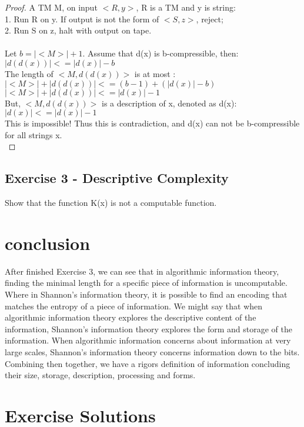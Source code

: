 \documentclass[12pt]{article}
\begin{document}
\begin{proof}
A TM M, on input $<R,y>$, R is a TM and y is string:\\
    1. Run R on y. If output is not the form of $<S,z>$, reject;\\
    2. Run S on z, halt with output on tape.\\
\\
Let $b = |<M>| + 1$. Assume that d(x) is b-compressible, then:\\
    $|d(d(x))| <= |d(x)| - b$\\
The length of $<M, d(d(x))>$ is at most :\\
    $|<M>| + |d(d(x))| <= (b-1) + (|d(x)|-b)$\\
    $|<M>| + |d(d(x))| <= |d(x)| - 1$\\
But, $<M, d(d(x))>$ is a description of x, denoted as d(x):\\
    $|d(x)| <= |d(x)| - 1$\\
This is impossible! Thus this is contradiction, and d(x) can not be b-compressible for all strings x.\\
\end{proof}

\subsection{Exercise 3 - Descriptive Complexity}
Show that the function K(x) is not a computable function.

\section{conclusion}
After finished Exercise 3, we can see that in algorithmic information theory, finding the minimal length for a specific piece of information is uncomputable. Where in Shannon's information theory, it is possible to find an encoding that matches the entropy of a piece of information. We might say that when algorithmic information theory explores the descriptive content of the information, Shannon's information theory explores the form and storage of the information. When algorithmic information concerns about information at very large scales, Shannon's information theory concerns information down to the bits. Combining then together, we have a rigors definition of information concluding their size, storage, description, processing and forms.





\section{Exercise Solutions}
\end{document}
